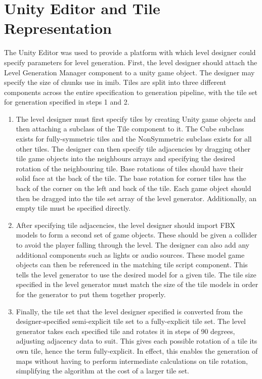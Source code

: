 \section{Unity Editor and Tile Representation}
The Unity Editor was used to provide a platform with which level designer could specify parameters for level generation. First, the level designer should attach the Level Generation Manager component to a unity game object. The designer may specify the size of chunks use in \acrlong{imib}. Tiles are split into three different components across the entire specification to generation pipeline, with the tile set for generation specified in steps 1 and 2.
\begin{enumerate}
    \item The level designer must first specify tiles by creating Unity game objects and then attaching a subclass of the Tile component to it. The Cube subclass exists for fully-symmetric tiles and the NonSymmetric subclass exists for all other tiles. The designer can then specify tile adjacencies by dragging other tile game objects into the neighbours arrays and specifying the desired rotation of the neighbouring tile. Base rotations of tiles should have their solid face at the back of the tile. The base rotation for corner tiles has the back of the corner on the left and back of the tile. Each game object should then be dragged into the tile set array of the level generator. Additionally, an empty tile must be specified directly.
    \item After specifying tile adjacencies, the level designer should import FBX models to form a second set of game objects. These should be given a collider to avoid the player falling through the level. The designer can also add any additional components such as lights or audio sources. These model game objects can then be referenced in the matching tile script component. This tells the level generator to use the desired model for a given tile. The tile size specified in the level generator must match the size of the tile models in order for the generator to put them together properly.
    \item Finally, the tile set that the level designer specified is converted from the designer-specified semi-explicit tile set to a fully-explicit tile set. The level generator takes each specified tile and rotates it in steps of 90 degrees, adjusting adjacency data to suit. This gives each possible rotation of a tile its own tile, hence the term fully-explicit. In effect, this enables the generation of maps without having to perform intermediate calculations on tile rotation, simplifying the algorithm at the cost of a larger tile set.
\end{enumerate}


